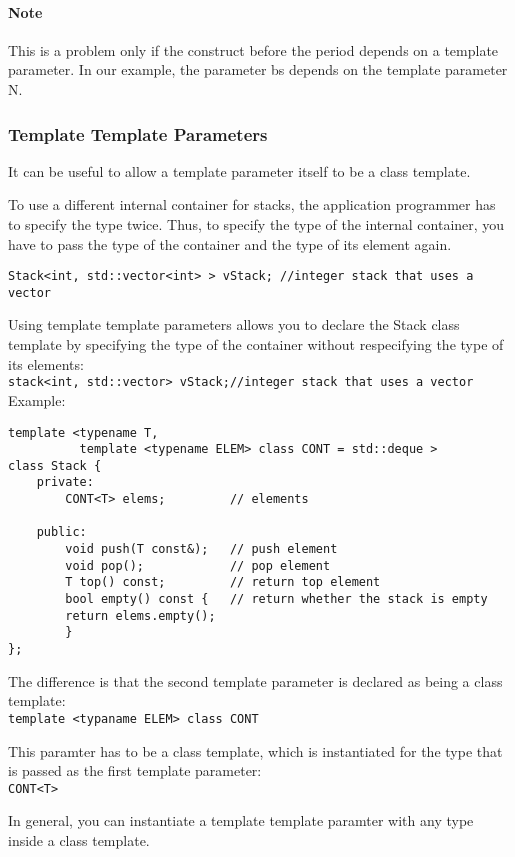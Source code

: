 \documentclass[11pt, a4paper]{book}
\begin{document}
\begin{itemize}
\paragraph{Note} This is a problem only if the construct before the period depends on a template parameter. In our example, the parameter bs depends on the template parameter N.
\subsubsection{Template Template Parameters}
It can be useful to allow a template parameter itself to be a class template. 

To use a different internal container for stacks, the application programmer has to specify the type twice. Thus, to specify the type of the internal container, you have to pass the type of the container and the type of its element again.
\begin{verbatim}
Stack<int, std::vector<int> > vStack; //integer stack that uses a vector
\end{verbatim}

Using template template parameters allows you to declare the Stack class template by specifying the type of the container without respecifying the type of its elements:\\
\verb|stack<int, std::vector> vStack;//integer stack that uses a vector|
Example:
\begin{verbatim}
template <typename T, 
          template <typename ELEM> class CONT = std::deque > 
class Stack { 
    private: 
        CONT<T> elems;         // elements 

    public: 
        void push(T const&);   // push element 
        void pop();            // pop element 
        T top() const;         // return top element 
        bool empty() const {   // return whether the stack is empty 
        return elems.empty(); 
        } 
}; 
\end{verbatim}

The difference is that the second template parameter is declared as being a class template:\\
\verb|template <typaname ELEM> class CONT|

This paramter has to be a class template, which is instantiated for the type that is passed as the first template parameter:\\
\verb|CONT<T>|

In general, you can instantiate a template template paramter with any type inside a class template.


\end{itemize}
\end{document}

